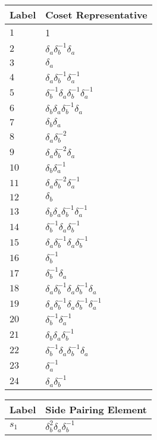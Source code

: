 \documentclass{article}
\begin{document}

\begin{center}
\begin{tabular}{ll}
\toprule
Label & Coset Representative\\
\midrule
$1$ & 1 \\
$2$ & $\delta_a^{}\delta_b^{-1}\delta_a^{}$ \\
$3$ & $\delta_a^{}$ \\
$4$ & $\delta_a^{}\delta_b^{-1}\delta_a^{-1}$ \\
$5$ & $\delta_b^{-1}\delta_a^{}\delta_b^{-1}\delta_a^{-1}$ \\
$6$ & $\delta_b^{}\delta_a^{}\delta_b^{-1}\delta_a^{}$ \\
$7$ & $\delta_b^{}\delta_a^{}$ \\
$8$ & $\delta_a^{}\delta_b^{-2}$ \\
$9$ & $\delta_a^{}\delta_b^{-2}\delta_a^{}$ \\
$10$ & $\delta_b^{}\delta_a^{-1}$ \\
$11$ & $\delta_a^{}\delta_b^{-2}\delta_a^{-1}$ \\
$12$ & $\delta_b^{}$ \\
$13$ & $\delta_b^{}\delta_a^{}\delta_b^{-1}\delta_a^{-1}$ \\
$14$ & $\delta_b^{-1}\delta_a^{}\delta_b^{-1}$ \\
$15$ & $\delta_a^{}\delta_b^{-1}\delta_a^{}\delta_b^{-1}$ \\
$16$ & $\delta_b^{-1}$ \\
$17$ & $\delta_b^{-1}\delta_a^{}$ \\
$18$ & $\delta_a^{}\delta_b^{-1}\delta_a^{}\delta_b^{-1}\delta_a^{}$ \\
$19$ & $\delta_a^{}\delta_b^{-1}\delta_a^{}\delta_b^{-1}\delta_a^{-1}$ \\
$20$ & $\delta_b^{-1}\delta_a^{-1}$ \\
$21$ & $\delta_b^{}\delta_a^{}\delta_b^{-1}$ \\
$22$ & $\delta_b^{-1}\delta_a^{}\delta_b^{-1}\delta_a^{}$ \\
$23$ & $\delta_a^{-1}$ \\
$24$ & $\delta_a^{}\delta_b^{-1}$ \\
\bottomrule
\end{tabular}
\hfill
\begin{tabular}{ll}
\toprule
Label & Side Pairing Element\\
\midrule
$s_{1}$ & $\delta_b^{2}\delta_a^{}\delta_b^{-1}$ \\

\end{tabular}
\end{center}
\end{document}
